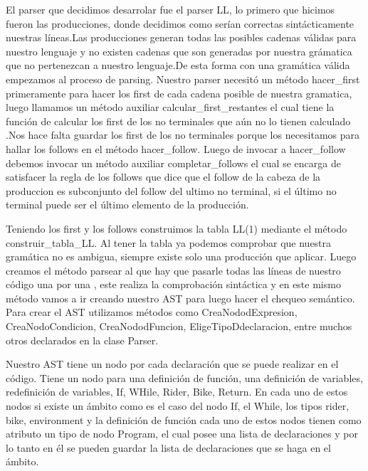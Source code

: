 \documentclass[12pt, letterpaper,spanish]{article}
\theoremstyle{definition}
\theoremstyle{remark}
\begin{document}
        El parser que decidimos desarrolar fue el parser LL, lo primero que hicimos fueron las producciones, donde decidimos como serían correctas sintácticamente nuestras líneas.Las producciones generan todas las posibles cadenas válidas para nuestro lenguaje y no existen cadenas que son generadas por nuestra grámatica que no pertenezcan a nuestro lenguaje.De esta forma con una gramática válida empezamos al proceso de parsing. Nuestro parser necesitó un método hacer\_first primeramente para hacer los first de cada cadena posible de nuestra gramatica, luego llamamos un método auxiliar calcular\_first\_restantes el cual tiene la función de calcular los first de los no terminales que aún no lo tienen calculado .Nos hace falta guardar los first de los no terminales porque los necesitamos para hallar los follows en el método hacer\_follow. Luego de invocar a hacer\_follow debemos invocar un método auxiliar completar\_follows el cual se encarga de satisfacer la regla de los follows que dice que el follow de la cabeza de la produccion es subconjunto del follow del ultimo no terminal, si el último no terminal puede ser el último elemento de la producción.

        Teniendo los first y los follows construimos la tabla LL(1) mediante el método construir\_tabla\_LL. Al tener la tabla ya podemos comprobar que nuestra gramática no es ambigua, siempre existe solo una producción que aplicar. Luego creamos el método parsear al que hay que pasarle todas las líneas de nuestro código una por una , este realiza la comprobación sintáctica y en este mismo método vamos a ir creando nuestro AST para luego hacer el chequeo semántico. Para crear el AST utilizamos métodos como CreaNododExpresion,  CreaNodoCondicion, CreaNododFuncion, EligeTipoDdeclaracion, entre muchos otros declarados en la clase Parser. 

        Nuestro AST tiene un nodo por cada declaración que se puede realizar en el código. Tiene un nodo para una definición de función, una 
        definición de variables, redefinición de variables, If, WHile, Rider, Bike, Return. En cada uno de estos nodos si existe un ámbito como es el caso del nodo If, el While, los tipos rider, bike, environment y la definición de función cada uno de estos nodos tienen como atributo un tipo de nodo Program, el cual posee una lista de declaraciones y por lo tanto en él se pueden guardar la lista de declaraciones que se haga en el ámbito.
\end{document}

